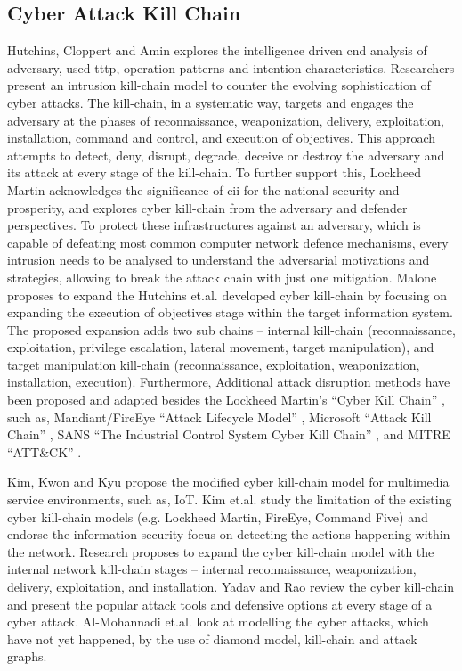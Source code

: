 \subsection{Cyber Attack Kill Chain}
\label{sec:killchain-work}
\glsresetall
Hutchins, Cloppert and Amin \cite{Hutchins2011} explores the intelligence driven \gls{cnd} analysis of adversary, used \gls{tttp}, operation patterns and intention characteristics. Researchers present an intrusion kill-chain model to counter the evolving sophistication of cyber attacks. The kill-chain, in a systematic way, targets and engages the adversary at the phases of reconnaissance, weaponization, delivery, exploitation, installation, command and control, and execution of objectives. This approach attempts to detect, deny, disrupt, degrade, deceive or destroy the adversary and its attack at every stage of the kill-chain. %
To further support this, Lockheed Martin \cite{LockheedMartin2015} acknowledges the significance of \gls{cii} for the national security and prosperity, and explores cyber kill-chain from the adversary and defender perspectives. To protect these infrastructures against an adversary, which is capable of defeating most common computer network defence mechanisms, every intrusion needs to be analysed to understand the adversarial motivations and strategies, allowing to break the attack chain with just one mitigation.
Malone proposes to expand the Hutchins et.al. developed cyber kill-chain \cite{Malone2016} by focusing on expanding the execution of objectives stage within the target information system. The proposed expansion adds two sub chains -- internal kill-chain (reconnaissance, exploitation, privilege escalation, lateral movement, target manipulation), and target manipulation kill-chain (reconnaissance, exploitation, weaponization, installation, execution).
Furthermore, Additional attack disruption methods have been proposed and adapted besides the Lockheed Martin's ``Cyber Kill Chain'' \cite{LockheedMartin2018}, such as, Mandiant/FireEye ``Attack Lifecycle Model'' \cite{FireEye2018}, Microsoft ``Attack Kill Chain'' \cite{Microsoft2018}, SANS ``The Industrial Control System Cyber Kill Chain'' \cite{SANS-ICS}, and MITRE ``ATT\&CK'' \cite{MITRE-ATTACK}.

Kim, Kwon and Kyu \cite{Kim2018} propose the modified cyber kill-chain model for multimedia service environments, such as, IoT. Kim et.al. study the limitation of the existing cyber kill-chain models (e.g. Lockheed Martin, FireEye, Command Five) and endorse the information security focus on detecting the actions happening within the network. Research proposes to expand the cyber kill-chain model with the internal network kill-chain stages -- internal reconnaissance, weaponization, delivery, exploitation, and installation.
Yadav and Rao \cite{Yadav2016} review the cyber kill-chain and present the popular attack tools and defensive options at every stage of a cyber attack.
Al-Mohannadi et.al. \cite{Al-Mohannadi2016} look at modelling the cyber attacks, which have not yet happened, by the use of diamond model, kill-chain and attack graphs.

